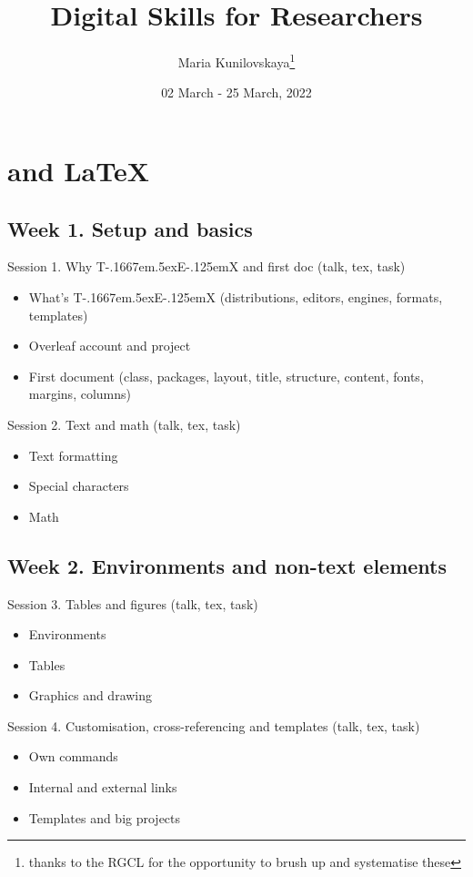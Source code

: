 \documentclass[a4paper,12pt]{article} %
\title{Digital Skills for Researchers}
\author{Maria Kunilovskaya\thanks{thanks to the RGCL for the opportunity to brush up and systematise these}}
\date{02 March - 25 March, 2022}
\def\TeX{{\rm T\kern-.1667em\lower.5ex\hbox{E}\kern-.125emX }}
\begin{document}
	
	\maketitle

\vspace{-2em}

\section{{\color{red}\TeX and \LaTeX}}

\subsection{Week 1. Setup and basics}
	Session 1. Why \TeX and first doc (talk, tex, task)
		\begin{itemize}
			\item What's \TeX (distributions, editors, engines, formats, templates)
			\item Overleaf account and project
			\item First document (class, packages, layout, title, structure, content, fonts, margins, columns)
		\end{itemize} 
	Session 2. Text and math (talk, tex, task)
		\begin{itemize}
			\item Text formatting
			\item Special characters
			\item Math
		\end{itemize}

\subsection*{Week 2. Environments and non-text elements}
	Session 3. Tables and figures (talk, tex, task)
			\begin{itemize}
				\item Environments
				\item Tables
				\item Graphics and drawing
			\end{itemize}
	Session 4. Customisation, cross-referencing and templates (talk, tex, task)
			\begin{itemize}
				\item Own commands
				\item Internal and external links
				\item Templates and big projects
			\end{itemize}
		
\end{document}
